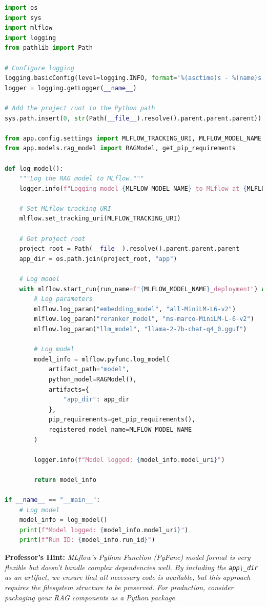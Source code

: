 \documentclass[
  screen,review,acmlarge]{acmart}
\newcommand{\passthrough}[1]{#1}
\begin{document}
\begin{lstlisting}[language=Python]
import os
import sys
import mlflow
import logging
from pathlib import Path

# Configure logging
logging.basicConfig(level=logging.INFO, format='%(asctime)s - %(name)s - %(levelname)s - %(message)s')
logger = logging.getLogger(__name__)

# Add the project root to the Python path
sys.path.insert(0, str(Path(__file__).resolve().parent.parent.parent))

from app.config.settings import MLFLOW_TRACKING_URI, MLFLOW_MODEL_NAME
from app.models.rag_model import RAGModel, get_pip_requirements

def log_model():
    """Log the RAG model to MLflow."""
    logger.info(f"Logging model {MLFLOW_MODEL_NAME} to MLflow at {MLFLOW_TRACKING_URI}")
    
    # Set MLflow tracking URI
    mlflow.set_tracking_uri(MLFLOW_TRACKING_URI)
    
    # Get project root
    project_root = Path(__file__).resolve().parent.parent.parent
    app_dir = os.path.join(project_root, "app")
    
    # Log model
    with mlflow.start_run(run_name=f"{MLFLOW_MODEL_NAME}_deployment") as run:
        # Log parameters
        mlflow.log_param("embedding_model", "all-MiniLM-L6-v2")
        mlflow.log_param("reranker_model", "ms-marco-MiniLM-L-6-v2")
        mlflow.log_param("llm_model", "llama-2-7b-chat-q4_0.gguf")
        
        # Log model
        model_info = mlflow.pyfunc.log_model(
            artifact_path="model",
            python_model=RAGModel(),
            artifacts={
                "app_dir": app_dir
            },
            pip_requirements=get_pip_requirements(),
            registered_model_name=MLFLOW_MODEL_NAME
        )
        
        logger.info(f"Model logged: {model_info.model_uri}")
        
        return model_info

if __name__ == "__main__":
    # Log model
    model_info = log_model()
    print(f"Model logged: {model_info.model_uri}")
    print(f"Run ID: {model_info.run_id}")
\end{lstlisting}

\textbf{Professor's Hint:} \emph{MLflow's Python Function (PyFunc) model format is very flexible but doesn't handle complex dependencies well. By including the \passthrough{\lstinline!app\_dir!} as an artifact, we ensure that all necessary code is available, but this approach requires the filesystem structure to be preserved. For production, consider packaging your RAG components as a Python package.}
\end{document}
